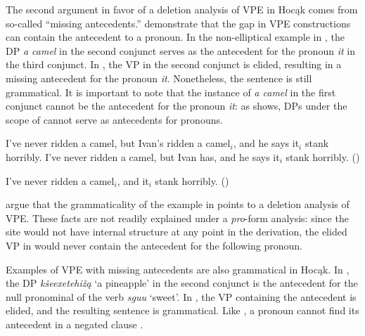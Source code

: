 \documentclass[output=paper]{LSP/langsci}
\begin{document}
 
The second argument in favor of a deletion analysis of VPE in Hocąk comes from so-called ``missing antecedents.'' \citet{HankamerSag1976} demonstrate that the gap in  VPE constructions can contain the antecedent to a pronoun. In the non-elliptical example in , the DP \emph{a camel} in the second conjunct serves as the antecedent for the pronoun \emph{it} in the third conjunct. In , the VP in the second conjunct is elided, resulting in a missing antecedent for the pronoun \emph{it}. Nonetheless, the sentence is still grammatical. It is important to note that the instance of \emph{a camel} in the first conjunct cannot be the antecedent for the pronoun \emph{it}: as  shows, DPs under the scope of  cannot serve as antecedents for pronouns.
 

 
\ea
\ea\label{ex:johnson:49a}
I've never ridden a camel, but Ivan's ridden a camel$_i$, and he says it$_i$ stank horribly.
\vspace{12pt}
\ex\label{ex:johnson:49b} 
I've never ridden a camel, but Ivan has, and he says it$_i$ stank horribly. (\citealt[403]{HankamerSag1976})
\z
\z
 
\ea\label{ex:johnson:50}
I've never ridden a camel$_i$, and it$_i$ stank horribly. (\citealt[404]{HankamerSag1976})
\z 

\citet{HankamerSag1976} argue that the grammaticality of the example in  points to a deletion analysis of VPE. These facts are not readily explained under a \emph{pro}-form analysis: since the  site would not have internal structure at any point in the derivation, the elided VP in  would never contain the antecedent for the following pronoun. 

 
Examples of VPE with missing antecedents are also grammatical in Hocąk. In , the DP \emph{kšeexetehižą} `a pineapple' in the second conjunct is the antecedent for the null pronominal  of the verb \emph{sguu} `sweet'. In , the VP containing the antecedent is elided, and the resulting sentence is grammatical. Like , a pronoun cannot find its antecedent in a negated clause .
 
\end{document}
